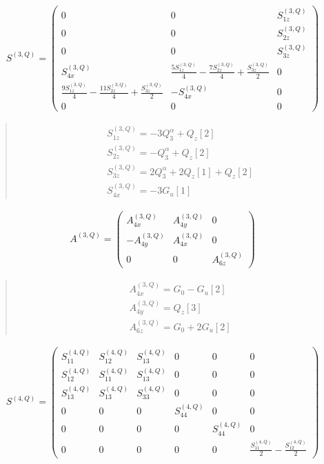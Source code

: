 \documentclass[fleqn,10pt]{jsarticle}
\begin{document}
\begin{align*}
S^{(3,Q)} = \begin{pmatrix} 0 & 0 & S^{(3,Q)}_{1z} \\ 0 & 0 & S^{(3,Q)}_{2z} \\ 0 & 0 & S^{(3,Q)}_{3z} \\ S^{(3,Q)}_{4x} & \frac{5 S^{(3,Q)}_{1z}}{4} - \frac{7 S^{(3,Q)}_{2z}}{4} + \frac{S^{(3,Q)}_{3z}}{2} & 0 \\ \frac{9 S^{(3,Q)}_{1z}}{4} - \frac{11 S^{(3,Q)}_{2z}}{4} + \frac{S^{(3,Q)}_{3z}}{2} & - S^{(3,Q)}_{4x} & 0 \\ 0 & 0 & 0 \end{pmatrix}
\end{align*}
\begin{quote}
\begin{align*}
& S^{(3,Q)}_{1z} = - 3 Q_{3}^{\alpha} + Q_{z}[2] \\
& S^{(3,Q)}_{2z} = - Q_{3}^{\alpha} + Q_{z}[2] \\
& S^{(3,Q)}_{3z} = 2 Q_{3}^{\alpha} + 2 Q_{z}[1] + Q_{z}[2] \\
& S^{(3,Q)}_{4x} = - 3 G_{u}[1]
\end{align*}
\end{quote}
\begin{align*}
A^{(3,Q)} = \begin{pmatrix} A^{(3,Q)}_{4x} & A^{(3,Q)}_{4y} & 0 \\ - A^{(3,Q)}_{4y} & A^{(3,Q)}_{4x} & 0 \\ 0 & 0 & A^{(3,Q)}_{6z} \end{pmatrix}
\end{align*}
\begin{quote}
\begin{align*}
& A^{(3,Q)}_{4x} = G_{0} - G_{u}[2] \\
& A^{(3,Q)}_{4y} = Q_{z}[3] \\
& A^{(3,Q)}_{6z} = G_{0} + 2 G_{u}[2]
\end{align*}
\end{quote}
\begin{align*}
S^{(4,Q)} = \begin{pmatrix} S^{(4,Q)}_{11} & S^{(4,Q)}_{12} & S^{(4,Q)}_{13} & 0 & 0 & 0 \\ S^{(4,Q)}_{12} & S^{(4,Q)}_{11} & S^{(4,Q)}_{13} & 0 & 0 & 0 \\ S^{(4,Q)}_{13} & S^{(4,Q)}_{13} & S^{(4,Q)}_{33} & 0 & 0 & 0 \\ 0 & 0 & 0 & S^{(4,Q)}_{44} & 0 & 0 \\ 0 & 0 & 0 & 0 & S^{(4,Q)}_{44} & 0 \\ 0 & 0 & 0 & 0 & 0 & \frac{S^{(4,Q)}_{11}}{2} - \frac{S^{(4,Q)}_{12}}{2} \end{pmatrix}
\end{align*}
\end{document}
